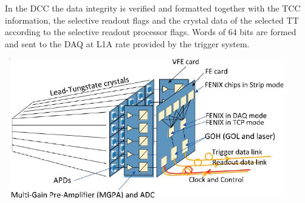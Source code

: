\newline
In the DCC the data integrity is verified and formatted together with the TCC information, the selective readout flags and the crystal data of the selected TT according to the selective readout processor flags. Words of 64 bits are formed and sent to the DAQ at L1A rate provided by the trigger system.

\vspace{5mm}

\begin{minipage}{0.99\textwidth} 
\begin{center}
\mbox{
\includegraphics[height=0.6\textwidth, width=0.9\textwidth]{THESISPLOTS/ECAL-FRONT-END-ELECTRONICS.jpg}
} 
\label{fig:readout2}
\end{center}
\end{minipage}


